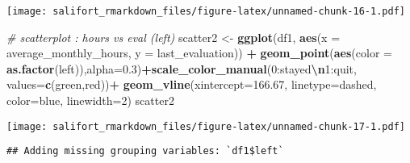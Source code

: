 \documentclass[
]{article}
\newenvironment{Shaded}{\begin{snugshade}}{\end{snugshade}}
\newcommand{\AttributeTok}[1]{\textcolor[rgb]{0.13,0.29,0.53}{#1}}
\newcommand{\CommentTok}[1]{\textcolor[rgb]{0.56,0.35,0.01}{\textit{#1}}}
\newcommand{\DecValTok}[1]{\textcolor[rgb]{0.00,0.00,0.81}{#1}}
\newcommand{\FloatTok}[1]{\textcolor[rgb]{0.00,0.00,0.81}{#1}}
\newcommand{\FunctionTok}[1]{\textcolor[rgb]{0.13,0.29,0.53}{\textbf{#1}}}
\newcommand{\NormalTok}[1]{#1}
\newcommand{\OtherTok}[1]{\textcolor[rgb]{0.56,0.35,0.01}{#1}}
\newcommand{\SpecialCharTok}[1]{\textcolor[rgb]{0.81,0.36,0.00}{\textbf{#1}}}
\newcommand{\StringTok}[1]{\textcolor[rgb]{0.31,0.60,0.02}{#1}}
\begin{document}
\texttt{[image: salifort\_rmarkdown\_files/figure-latex/unnamed-chunk-16-1.pdf]}

\begin{Shaded}
\begin{Highlighting}[]
\CommentTok{\# scatterplot : hours vs eval (left)}
\NormalTok{scatter2 }\OtherTok{\textless{}{-}} \FunctionTok{ggplot}\NormalTok{(df1, }\FunctionTok{aes}\NormalTok{(}\AttributeTok{x =}\NormalTok{ average\_monthly\_hours, }\AttributeTok{y =}\NormalTok{ last\_evaluation)) }\SpecialCharTok{+}
  \FunctionTok{geom\_point}\NormalTok{(}\FunctionTok{aes}\NormalTok{(}\AttributeTok{color =} \FunctionTok{as.factor}\NormalTok{(left)),}\AttributeTok{alpha=}\FloatTok{0.3}\NormalTok{)}\SpecialCharTok{+}\FunctionTok{scale\_color\_manual}\NormalTok{(}\StringTok{\textquotesingle{}0:stayed}\SpecialCharTok{\textbackslash{}n}\StringTok{1:quit\textquotesingle{}}\NormalTok{, }\AttributeTok{values=}\FunctionTok{c}\NormalTok{(}\StringTok{\textquotesingle{}green\textquotesingle{}}\NormalTok{,}\StringTok{\textquotesingle{}red\textquotesingle{}}\NormalTok{))}\SpecialCharTok{+}
  \FunctionTok{geom\_vline}\NormalTok{(}\AttributeTok{xintercept=}\FloatTok{166.67}\NormalTok{, }\AttributeTok{linetype=}\StringTok{\textquotesingle{}dashed\textquotesingle{}}\NormalTok{, }\AttributeTok{color=}\StringTok{\textquotesingle{}blue\textquotesingle{}}\NormalTok{, }\AttributeTok{linewidth=}\DecValTok{2}\NormalTok{)}
\NormalTok{scatter2}
\end{Highlighting}
\end{Shaded}

\texttt{[image: salifort\_rmarkdown\_files/figure-latex/unnamed-chunk-17-1.pdf]}

\begin{Shaded}
\end{Shaded}

\begin{verbatim}
## Adding missing grouping variables: `df1$left`
\end{verbatim}
\end{document}
